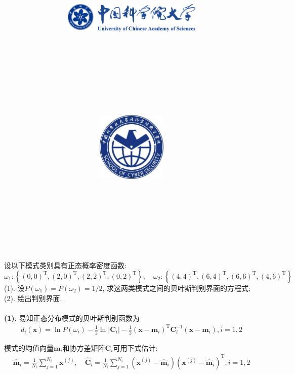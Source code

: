 \documentclass{article}
\title{
	\includegraphics[width=0.5\textwidth]{images/title/ucas_logo 1.pdf}\\
    \vspace{1in}
    \textmd{\textbf{\hmwkClass}}\\
    \textmd{\textbf{\hmwkTitle}}\\
    \normalsize\vspace{0.1in}\large{\hmwkCompleteTime }\\
    \vspace{0.1in}\large{\textit{\hmwkClassInstructor\ }}\\
    \vspace{1in}
	\includegraphics[width=0.25\textwidth]{images/title/Cyber.jpg}\\
	\vspace{1in}
}
\author{
	\hmwkAuthorName \\ 
	\hmwkAuthorStuID \\
	\hmwkAuthorInst \\
	\hmwkAuthorzhuanye \\
	\hmwkAuthorfangxiang
	}
\date{}
\begin{document}
\maketitle


%
%
%
%
%


\pagebreak

\begin{homeworkProblem}
	设以下模式类别具有正态概率密度函数:
	$$\omega _1: \left\{ \left( 0,0 \right) ^{\mathrm{T}},\left( 2,0 \right) ^{\mathrm{T}},\left( 2,2 \right) ^{\mathrm{T}},\left( 0,2 \right) ^{\mathrm{T}} \right\} ,\quad \omega _2: \left\{ \left( 4,4 \right) ^{\mathrm{T}},\left( 6,4 \right) ^{\mathrm{T}},\left( 6,6 \right) ^{\mathrm{T}},\left( 4,6 \right) ^{\mathrm{T}} \right\} 
	$$
	(1). 设$P(\omega_1)=P(\omega_2)=1/2$, 求这两类模式之间的贝叶斯判别界面的方程式;\quad 
	(2). 绘出判别界面.
	\\

	\solution
	\\

	\textbf{(1).} 易知正态分布模式的贝叶斯判别函数为
	\begin{align}
		d_i\left( \boldsymbol{x} \right) =\ln P\left( \omega _i \right) -\frac{1}{2}\ln \left| \boldsymbol{C}_i \right|-\frac{1}{2}\left( \boldsymbol{x}-\boldsymbol{m}_i \right) ^{\mathrm{T}}\boldsymbol{C}_{i}^{-1}\left( \boldsymbol{x}-\boldsymbol{m}_i \right) , i=1,2
	\end{align}
	
	模式的均值向量$\boldsymbol{m}_i$和协方差矩阵$\boldsymbol{C}_i$可用下式估计:
	\begin{align}
		\widehat{\boldsymbol{m}}_i=\frac{1}{N_i}\sum_{j=1}^{N_i}{\boldsymbol{x}^{\left( j \right)}},\quad \widehat{\boldsymbol{C}}_i=\frac{1}{N_i}\sum_{j=1}^{N_i}{\left( \boldsymbol{x}^{\left( j \right)}-\widehat{\boldsymbol{m}}_i \right) \left( \boldsymbol{x}^{\left( j \right)}-\widehat{\boldsymbol{m}}_i \right) ^{\mathrm{T}}}, i=1,2
	\end{align}


\end{homeworkProblem}
\end{document}
